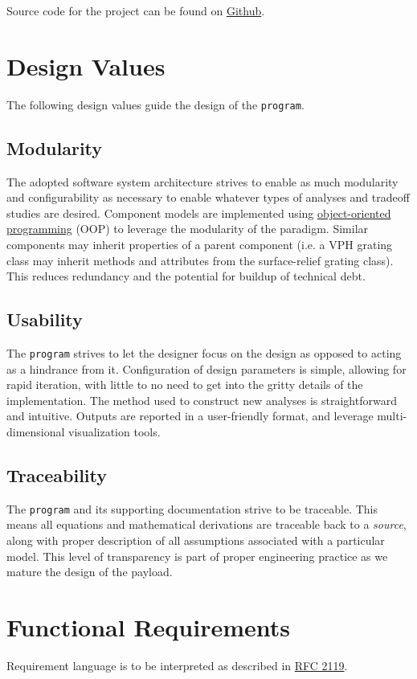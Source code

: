 \documentclass{article}
\begin{document}
Source code for the project can be found on \href{https://github.com/spacesys-finch/payload-designer}{Github}.

\section{Design Values}
The following design values guide the design of the \texttt{program}.

\subsection{Modularity}
The adopted software system architecture strives to enable as much modularity and configurability as necessary to enable whatever types of analyses and tradeoff studies are desired. Component models are implemented using \href{https://en.wikipedia.org/wiki/Object-oriented_programming}{object-oriented programming} (OOP) to leverage the modularity of the paradigm. Similar components may inherit properties of a parent component (i.e. a VPH grating class may inherit methods and attributes from the surface-relief grating class). This reduces redundancy and the potential for buildup of technical debt.

\subsection{Usability}
The \texttt{program} strives to let the designer focus on the design as opposed to acting as a hindrance from it.  Configuration of design parameters is simple, allowing for rapid iteration, with little to no need to get into the gritty details of the implementation. The method used to construct new analyses is straightforward and intuitive. Outputs are reported in a user-friendly format, and leverage multi-dimensional visualization tools.

\subsection{Traceability}
The \texttt{program} and its supporting documentation strive to be traceable. This means all equations and mathematical derivations are traceable back to a \textit{source}, along with proper description of all assumptions associated with a particular model. This level of transparency is part of proper engineering practice as we mature the design of the payload.

\section{Functional Requirements}
Requirement language is to be interpreted as described in \href{https://microformats.org/wiki/rfc-2119}{RFC 2119}.
\end{document}

